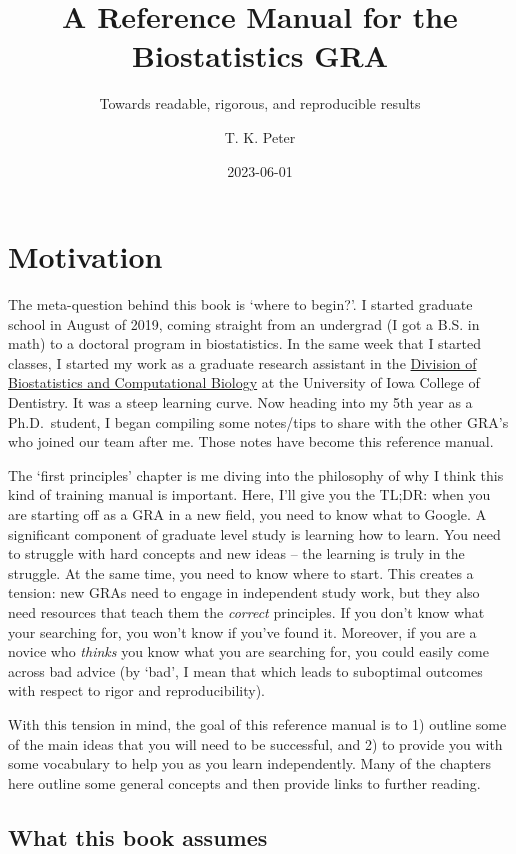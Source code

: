 \documentclass[
]{book}
\title{A Reference Manual for the Biostatistics GRA}
\subtitle{Towards readable, rigorous, and reproducible results}
\author{T. K. Peter}
\date{2023-06-01}
\begin{document}
\maketitle

{
\setcounter{tocdepth}{1}
\tableofcontents
}
\hypertarget{motivation}{%
\chapter{Motivation}\label{motivation}}

The meta-question behind this book is `where to begin?'. I started graduate school in August of 2019, coming straight from an undergrad (I got a B.S. in math) to a doctoral program in biostatistics. In the same week that I started classes, I started my work as a graduate research assistant in the \href{https://dentistry.uiowa.edu/research/biostatistics-and-computational-biology}{Division of Biostatistics and Computational Biology} at the University of Iowa College of Dentistry. It was a steep learning curve. Now heading into my 5th year as a Ph.D.~student, I began compiling some notes/tips to share with the other GRA's who joined our team after me. Those notes have become this reference manual.

The `first principles' chapter is me diving into the philosophy of why I think this kind of training manual is important. Here, I'll give you the TL;DR: when you are starting off as a GRA in a new field, you need to know what to Google. A significant component of graduate level study is learning how to learn. You need to struggle with hard concepts and new ideas -- the learning is truly in the struggle. At the same time, you need to know where to start. This creates a tension: new GRAs need to engage in independent study work, but they also need resources that teach them the \emph{correct} principles. If you don't know what your searching for, you won't know if you've found it. Moreover, if you are a novice who \emph{thinks} you know what you are searching for, you could easily come across bad advice (by `bad', I mean that which leads to suboptimal outcomes with respect to rigor and reproducibility).

With this tension in mind, the goal of this reference manual is to 1) outline some of the main ideas that you will need to be successful, and 2) to provide you with some vocabulary to help you as you learn independently. Many of the chapters here outline some general concepts and then provide links to further reading.

\hypertarget{what-this-book-assumes}{%
\section{What this book assumes}\label{what-this-book-assumes}}
\end{document}
